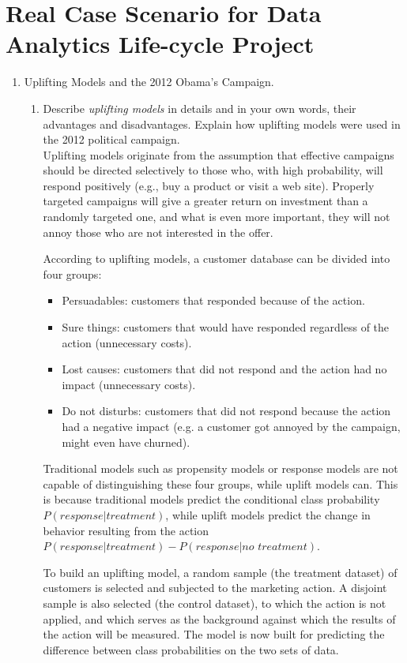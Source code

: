 \documentclass{article}
\begin{document}
\section{Real Case Scenario for Data Analytics Life-cycle Project}
    \begin{enumerate}[label=(\alph*)]
        \item Uplifting Models and the 2012 Obama’s Campaign.
        \begin{enumerate}[label=\arabic*.]
            \item Describe \emph{uplifting models} in details and in your own words, their advantages and disadvantages. Explain how uplifting models were used in the 2012 political campaign.\\
\newline
Uplifting models originate from the assumption that effective campaigns should be directed selectively to those who, with high probability, will respond positively (e.g., buy a product or visit a web site). Properly targeted campaigns will give a greater return on investment than a randomly targeted one, and what is even more important, they will not annoy those who are not interested in the offer. 

According to uplifting models, a customer database can be divided into four groups:
\begin{itemize}
    \item Persuadables: customers that responded because of the action.
    \item Sure things: customers that would have responded regardless of the action (unnecessary costs).
    \item Lost causes: customers that did not respond and the action had no impact (unnecessary costs).
    \item Do not disturbs: customers that did not respond because the action had a negative impact (e.g. a customer got annoyed by the campaign, might even have churned).
\end{itemize}

Traditional models such as propensity models or response models are not capable of distinguishing these four groups, while uplift models can. This is because traditional models predict the conditional class probability $P(\textit{response}|\textit{treatment})$, while uplift models predict the change in behavior resulting from the action $P(\textit{response}|\textit{treatment}) - P(\textit{response}|\textit{no treatment})$.

To build an uplifting model, a random sample (the treatment dataset) of customers is selected and subjected to the marketing action. A disjoint sample is also selected (the control dataset), to which the action is not applied, and which serves as the background against which the results of the action will be measured. The model is now built for predicting the difference between class probabilities on the two sets of data.


\end{enumerate}
\end{enumerate}
\end{document}
